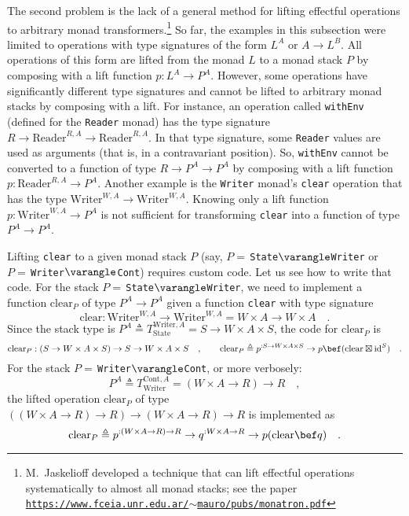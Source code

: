 The second problem is the lack of a general method for lifting effectful
operations to arbitrary monad transformers.\footnote{M.~Jaskelioff developed a technique that
can lift effectful operations systematically to almost all monad stacks;
see the paper \texttt{\href{https://www.fceia.unr.edu.ar/~mauro/pubs/monatron.pdf}{https://www.fceia.unr.edu.ar/$\sim$mauro/pubs/monatron.pdf}}} So far, the examples in this subsection were limited to operations
with type signatures of the form $L^{A}$ or $A\rightarrow L^{B}$.
All operations of this form are lifted from the monad $L$ to a monad
stack $P$ by composing with a lift function $p:L^{A}\rightarrow P^{A}$.
However, some operations have significantly different type signatures
and cannot be lifted to arbitrary monad stacks by composing with a
lift. For instance, an operation called \lstinline!withEnv! (defined
for the \lstinline!Reader! monad) has the type signature $R\rightarrow\text{Reader}^{R,A}\rightarrow\text{Reader}^{R,A}$.
In that type signature, some \lstinline!Reader! values are used as
arguments (that is, in a contravariant position). So, \lstinline!withEnv!
cannot be converted to a function of type $R\rightarrow P^{A}\rightarrow P^{A}$
by composing with a lift function $p:\text{Reader}^{R,A}\rightarrow P^{A}$.
Another example is the \lstinline!Writer! monad\textsf{'}s \lstinline!clear!
operation that has the type $\text{Writer}^{W,A}\rightarrow\text{Writer}^{W,A}$.
Knowing only a lift function $p:\text{Writer}^{W,A}\rightarrow P^{A}$
is not sufficient for transforming \lstinline!clear! into a function
of type $P^{A}\rightarrow P^{A}$.

Lifting \lstinline!clear! to a given monad stack $P$ (say, $P=\,$\lstinline!State!$\varangle$\lstinline!Writer!
or $P=\,$\lstinline!Writer!$\varangle$\lstinline!Cont!) requires
custom code. Let us see how to write that code. For the stack $P=\,$\lstinline!State!$\varangle$\lstinline!Writer!,
we need to implement a function $\text{clear}_{P}$ of type $P^{A}\rightarrow P^{A}$
given a function \lstinline!clear! with type signature
\[
\text{clear}:\text{Writer}^{W,A}\rightarrow\text{Writer}^{W,A}=W\times A\rightarrow W\times A\quad.
\]
Since the stack type is $P^{A}\triangleq T_{\text{State}}^{\text{Writer},A}=S\rightarrow W\times A\times S$,
the code for $\text{clear}_{P}$ is
\[
\text{clear}_{P}:\left(S\rightarrow W\times A\times S\right)\rightarrow S\rightarrow W\times A\times S\quad,\quad\quad\text{clear}_{P}\triangleq p^{:S\rightarrow W\times A\times S}\rightarrow p\bef(\text{clear}\boxtimes\text{id}^{S})\quad.
\]
For the stack $P=\,$\lstinline!Writer!$\varangle$\lstinline!Cont!,
or more verbosely:
\[
P^{A}\triangleq T_{\text{Writer}}^{\text{Cont},A}=(W\times A\rightarrow R)\rightarrow R\quad,
\]
the lifted operation $\text{clear}_{P}$ of type $\left((W\times A\rightarrow R)\rightarrow R\right)\rightarrow(W\times A\rightarrow R)\rightarrow R$
is implemented as
\[
\text{clear}_{P}\triangleq p^{:(W\times A\rightarrow R)\rightarrow R}\rightarrow q^{:W\times A\rightarrow R}\rightarrow p(\text{clear}\bef q)\quad.
\]


